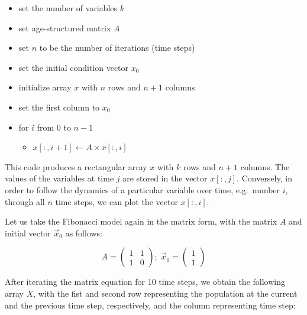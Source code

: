 \documentclass[
  letterpaper,
  DIV=11,
  numbers=noendperiod]{scrreprt}
\providecommand{\tightlist}{%
  \setlength{\itemsep}{0pt}\setlength{\parskip}{0pt}}\usepackage{longtable,booktabs,array}
\begin{document}
\begin{tcolorbox}[enhanced jigsaw, colbacktitle=quarto-callout-tip-color!10!white, leftrule=.75mm, coltitle=black, left=2mm, breakable, opacityback=0, colback=white, toprule=.15mm, opacitybacktitle=0.6, bottomtitle=1mm, colframe=quarto-callout-tip-color-frame, rightrule=.15mm, bottomrule=.15mm, toptitle=1mm, titlerule=0mm, arc=.35mm, title={Solution of matrix discrete-time models}]

\begin{itemize}
\tightlist
\item
  set the number of variables \(k\)
\item
  set age-structured matrix \(A\)
\item
  set \(n\) to be the number of iterations (time steps)
\item
  set the initial condition vector \(x_0\)
\item
  initialize array \(x\) with \(n\) rows and \(n + 1\) columns
\item
  set the first column to \(x_0\)
\item
  for \(i\) from 0 to \(n - 1\)

  \begin{itemize}
  \tightlist
  \item
    \(x[:, i+1] \gets A \times x[:, i]\)
  \end{itemize}
\end{itemize}

\end{tcolorbox}

This code produces a rectangular array \(x\) with \(k\) rows and
\(n + 1\) columns. The values of the variables at time \(j\) are stored
in the vector \(x[:,j]\). Conversely, in order to follow the dynamics of
a particular variable over time, e.g.~number \(i\), through all \(n\)
time steps, we can plot the vector \(x[:,i]\).

Let us take the Fibonacci model again in the matrix form, with the
matrix \(A\) and initial vector \(\vec x_0\) as follows:

\[
A =  \left(\begin{array}{cc}1 & 1\\1 & 0\end{array}\right); \;  \vec x_0 =   \left(\begin{array}{c}1 \\1 \end{array}\right)
\]

After iterating the matrix equation for 10 time steps, we obtain the
following array \(X\), with the fist and second row representing the
population at the current and the previous time step, respectively, and
the column representing time step:
\end{document}
